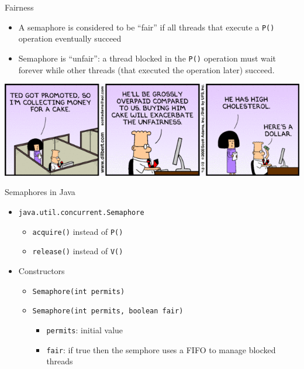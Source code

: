 \begin{frame}{Fairness}
  \begin{itemize}
  \item A semaphore is considered to be ``fair'' if all threads that
    execute a \lstinline!P()! operation eventually succeed
  \item Semaphore is ``unfair'': a thread blocked in the
    \lstinline!P()! operation must wait forever while other threads
    (that executed the operation later) succeed.
  \end{itemize}

  
  \begin{center}
    \includegraphics[scale=0.4]{figures/dilbert-fairness}
  \end{center}
\end{frame}

\begin{frame}{Semaphores in Java}
  \begin{itemize}
  \item \lstinline!java.util.concurrent.Semaphore!
    \begin{itemize}
    \item \lstinline!acquire()! instead of \lstinline!P()!
    \item \lstinline!release()! instead of \lstinline!V()!
    \end{itemize}
  \item Constructors
    \begin{itemize}
    \item \lstinline!Semaphore(int permits)!
    \item \lstinline!Semaphore(int permits, boolean fair)!
      \begin{itemize}
      \item \lstinline!permits!: initial value
      \item \lstinline!fair!: if true then the semphore uses a FIFO to
        manage blocked threads
      \end{itemize}
    \end{itemize}
  \end{itemize}
\end{frame}


